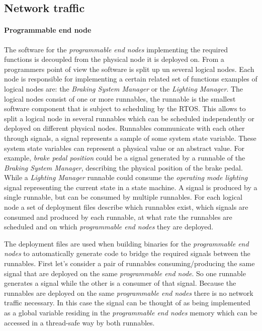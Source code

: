 \subsection{Network traffic}
\paragraph{Programmable end node}
The software for the \textit{programmable end nodes} implementing the required functions is decoupled from the physical node it is deployed on. From a programmers point of view the software is split up un several logical nodes. Each node is responsible for implementing a certain related set of functions examples of logical nodes are: the \textit{Braking System Manager} or the \textit{Lighting Manager}. The logical nodes consist of one or more runnables, the runnable is the smallest software component that is subject to scheduling by the RTOS. This allows to split a logical node in several runnables which can be scheduled independently or deployed on different physical nodes. Runnables communicate with each other through signals, a signal represents a sample of some system state variable. These system state variables can represent a physical value or an abstract value. For example, \textit{brake pedal position} could be a signal generated by a runnable of the \textit{Braking System Manager}, describing the physical position of the brake pedal. While a \textit{Lighting Manager} runnable could consume the \textit{operating mode lighting} signal representing the current state in a state machine. A signal is produced by a single runnable, but can be consumed by multiple runnables. For each logical node a set of deployment files describe which runnables exist, which signals are consumed and produced by each runnable, at what rate the runnables are scheduled and on which \textit{programmable end nodes} they are deployed.

The deployment files are used when building binaries for the \textit{programmable end nodes} to automatically generate code to bridge the required signals between the runnables. First let's consider a pair of runnables consuming/producing the same signal that are deployed on the same \textit{programmable end node}. So one runnable generates a signal while the other is a consumer of that signal. Because the runnables are deployed on the same \textit{programmable end nodes} there is no network traffic necessary. In this case the signal can be thought of as being implemented as a global variable residing in the \textit{programmable end nodes} memory which can be accessed in a thread-safe way by both runnables.


